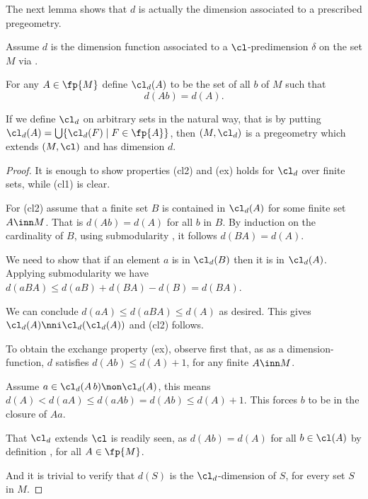 The next lemma shows that $d$ is actually
the dimension associated to a prescribed pregeometry.
\begin{lem}\label{preg}
Assume $d$ is the dimension function associated to a $\cl$-predimension $\delta$ on
the set $M$ via .

For any $A\in\fp{M}$ define $\cl_{d}(A)$ to be the set of all $b$ of $M$ such that $$d(Ab)=d(A).$$

If we define $\cl_{d}$ on arbitrary sets in the natural way, that is by putting $\cl_{d}(A)=\bigcup\{\cl_{d}(F)\mid F\in\fp{A}\}$,
then $(M,\cl_{d})$ is a pregeometry which extends $(M,\cl)$ and has dimension $d$.
\end{lem}
\begin{proof}
It is enough to show properties (cl2) and (ex) holds for $\cl_{d}$ over finite sets, while (cl1) is clear.

For (cl2) assume %
that a finite set $B$ is contained in %
$\cl_{d}(A)$ for some finite set $A\inn M$. That is $d(Ab)=d(A)$ for all $b$ in $B$.
By induction on the cardinality of $B$, using submodularity , it follows $d(BA)=d(A)$.

We need to show that if an element $a$ is in $\cl_{d}(B)$ then it is in $\cl_{d}(A)$.
Applying submodularity we have $d(aBA)\leq d(aB)+d(BA)-d(B)=d(BA)$. 

We can conclude $d(aA)\leq d(aBA)\leq d(A)$ as desired. This gives $\cl_{d}(A)\nni \cl_{d}(\cl_{d}(A))$ and (cl2) follows.

\smallskip
To obtain the exchange property (ex), observe first that, as as a dimension-function, $d$ satisfies $d(Ab)\leq d(A)+1$, for any finite $A\inn M$.

Assume $a\in\cl_{d}(A\,b)\non\cl_{d}(A)$, this means $d(A)<d(aA)\leq
d(aAb)=d(Ab)\leq d(A)+1$. This forces $b$ to be in the closure of $Aa$.

\smallskip
That $\cl_{d}$ extends $\cl$ is readily seen, as $d(Ab)=d(A)$ for all $b\in\cl(A)$ by definition , for all $A\in\fp{M}$.

And it is trivial to verify that $d(S)$ %
is the $\cl_{d}$-dimension of $S$, for every set $S$ in $M$.
\end{proof}

%
%
